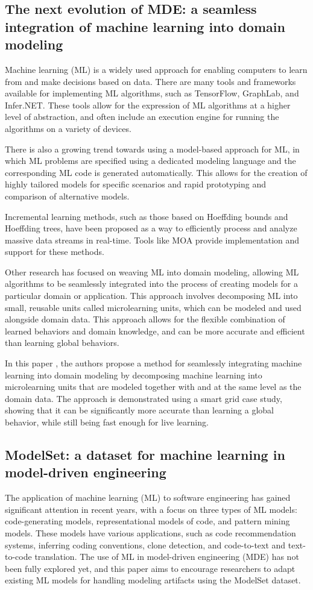 \subsection{The next evolution of MDE: a seamless integration of machine
learning into domain modeling}
Machine learning (ML) is a widely used approach for enabling computers to learn from and make decisions based on data. There are many tools and frameworks available for implementing ML algorithms, such as TensorFlow, GraphLab, and Infer.NET. These tools allow for the expression of ML algorithms at a higher level of abstraction, and often include an execution engine for running the algorithms on a variety of devices.

There is also a growing trend towards using a model-based approach for ML, in which ML problems are specified using a dedicated modeling language and the corresponding ML code is generated automatically. This allows for the creation of highly tailored models for specific scenarios and rapid prototyping and comparison of alternative models.

Incremental learning methods, such as those based on Hoeffding bounds and Hoeffding trees, have been proposed as a way to efficiently process and analyze massive data streams in real-time. Tools like MOA provide implementation and support for these methods.

Other research has focused on weaving ML into domain modeling, allowing ML algorithms to be seamlessly integrated into the process of creating models for a particular domain or application. This approach involves decomposing ML into small, reusable units called microlearning units, which can be modeled and used alongside domain data. This approach allows for the flexible combination of learned behaviors and domain knowledge, and can be more accurate and efficient than learning global behaviors.

In this paper \cite {}, the authors propose a method for seamlessly integrating machine learning into domain modeling by decomposing machine learning into microlearning units that are modeled together with and at the same level as the domain data. The approach is demonstrated using a smart grid case study, showing that it can be significantly more accurate than learning a global behavior, while still being fast enough for live learning.

\subsection{ModelSet: a dataset for machine learning in model-driven engineering}
The application of machine learning (ML) to software engineering has gained significant attention in recent years, with a focus on three types of ML models: code-generating models, representational models of code, and pattern mining models. These models have various applications, such as code recommendation systems, inferring coding conventions, clone detection, and code-to-text and text-to-code translation. The use of ML in model-driven engineering (MDE) has not been fully explored yet, and this paper \cite{} aims to encourage researchers to adapt existing ML models for handling modeling artifacts using the ModelSet dataset.

